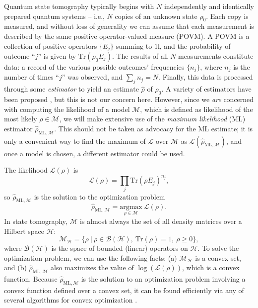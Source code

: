 \documentclass[aps,pra, twocolumn]{revtex4-1}
\newcommand{\M}{\mathcal{M}}
\newcommand{\Tr}{\mathrm{Tr}}
\newcommand{\cH}{\mathcal{H}}
\newcommand{\cL}{\mathcal{L}}
\newcommand{\Id}{\mathbb{I}}
\def\Id{1\!\mathrm{l}}
\newcommand{\rhohat}{\hat{\rho}}
\newcommand{\rhoML}[1]{\rhohat_{\scriptscriptstyle{\mathrm{ML},#1}}}
\begin{document}
Quantum state tomography typically begins with $N$ independently and identically prepared quantum systems -- i.e., $N$ copies of an unknown state $\rho_{0}$.  Each copy is measured, and without loss of generality we can assume that each measurement is described by the same positive operator-valued measure (POVM).  A POVM is a collection of positive operators $\{E_j\}$ summing to $\Id$, and the probability of outcome ``$j$'' is given by $\Tr(\rho_0 E_j)$.  The results of all $N$ measurements constitute data:  a record of the various possible outcomes' frequencies $\{n_{j}\}$, where $n_{j}$ is the number of times ``$j$'' was observed, and $\sum_{j}n_{j} = N$.  Finally, this data is processed through some \emph{estimator} to yield an estimate $\hat{\rho}$ of $\rho_0$.  A variety of estimators have been proposed \cite{Vogel1989,Hradil1997,JamesPRA2001,Blume-Kohout2010b,Blume-Kohout2010,Zhu2014a,Ferrie2016}, but this is not our concern here.  However, since we \emph{are} concerned with computing the likelihood of a model $\M$, which is defined as likelihood of the most likely $\rho\in\M$, we will make extensive use of the \emph{maximum likelihood} (ML) estimator $\rhoML{\M}$.  This should not be taken as advocacy for the ML estimate; it is only a convenient way to find the maximum of $\cL$ over $\M$ as $\mathcal{L}(\rhoML{\M})$, and once a model is chosen, a different estimator could be used.

The likelihood $\mathcal{L}(\rho)$ is
\begin{equation}
\mathcal{L}(\rho) = \prod_{j}\mathrm{Tr}(\rho E_{j})^{n_{j}},
\end{equation}
so $\rhoML{\M}$ is the solution to the optimization problem
\begin{equation}
\rhoML{\M} = \underset{\rho \in \M}{\text{argmax}}~\mathcal{L}(\rho).
\end{equation}
In state tomography, $\M$ is almost always the set of all density matrices over a Hilbert space $\cH$:
\begin{equation}
\mathcal{M}_{\cH} = \{\rho~|~\rho \in \mathcal{B}(\mathcal{H}),~\mathrm{Tr}(\rho) =1,~\rho \geq 0\},
\end{equation}
where $\mathcal{B}(\cH)$ is the space of bounded (linear) operators on $\cH$.  To solve the optimization problem, we can use the following facts: (a) $\M_{\cH}$ is a convex set, and (b) $\rhoML{\M}$ also maximizes the value of $\log(\cL(\rho))$, which is a convex function. Because $\rhoML{\M}$ is the solution to an optimization problem involving a convex function defined over a convex set, it can be found efficiently via any of several algorithms for convex optimization \cite{Boyd}.
\end{document}
